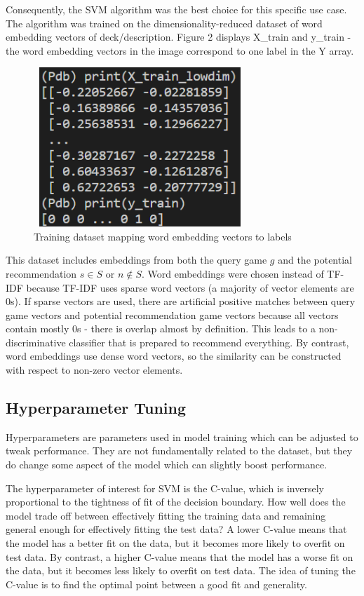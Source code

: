 \documentclass[10pt,twocolumn]{article}
\begin{document}
Consequently, the SVM algorithm was the best choice for this specific use case. The algorithm was trained on the dimensionality-reduced dataset of word embedding vectors of deck/description. Figure 2 displays X\_train and y\_train - the word embedding vectors in the image correspond to one label in the Y array. 

\begin{figure}[h!]
\includegraphics[width=8cm, height=6cm]{train_set_img.PNG}
\centering
\caption{Training dataset mapping word embedding vectors to labels}
\end{figure}


This dataset includes embeddings from both the query game $g$ and the potential recommendation $s \in S$ or $n \not\in S$. Word embeddings were chosen instead of TF-IDF because TF-IDF uses sparse word vectors (a majority of vector elements are 0s). If sparse vectors are used, there are artificial positive matches between query game vectors and potential recommendation game vectors because all vectors contain mostly 0s - there is overlap almost by definition. This leads to a non-discriminative classifier that is prepared to recommend everything. By contrast, word embeddings use dense word vectors, so the similarity can be constructed with respect to non-zero vector elements. 

\subsection{Hyperparameter Tuning}
Hyperparameters are parameters used in model training which can be adjusted to tweak performance. They are not fundamentally related to the dataset, but they do change some aspect of the model which can slightly boost performance. 

The hyperparameter of interest for SVM is the C-value, which is inversely proportional to the tightness of fit of the decision boundary. How well does the model trade off between effectively fitting the training data and remaining general enough for effectively fitting the test data? A lower C-value means that the model has a better fit on the data, but it becomes more likely to overfit on test data. By contrast, a higher C-value means that the model has a worse fit on the data, but it becomes less likely to overfit on test data. The idea of tuning the C-value is to find the optimal point between a good fit and generality.
\end{document}
